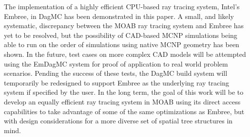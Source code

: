 \documentclass{anstrans}
\begin{document}
The implementation of a highly efficient CPU-based ray tracing system, Intel's Embree, in DagMC has been demonstrated in this paper. A small, and likely systematic, discrepancy between the MOAB ray tracing system and Embree has yet to be resolved, but the possibility of CAD-based MCNP simulations being able to run on the order of simulations using native MCNP geometry has been shown.
In the future, test cases on more complex CAD models will be attempted using the EmDagMC system for proof of application to real world problem scenarios. Pending the success of these tests, the DagMC build system will temporarily be redesigned to support Embree as the underlying ray tracing system if specified by the user. In the long term, the goal of this work will be to develop an equally efficient ray tracing system in MOAB using its direct access capabilities to take advantage of some of the same optimizations as Embree, but with design considerations for a more diverse set of spatial tree structures in mind. 

\vspace{-0.2cm}


\end{document}
